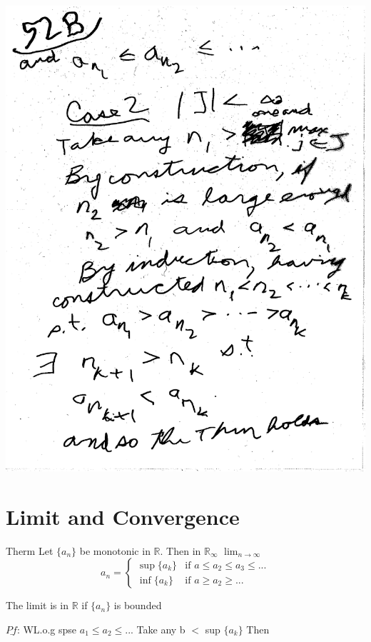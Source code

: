 \documentclass[10pt,a4paper]{article}
\begin{document}
{{\includegraphics[scale=.5]{Pages/SL_11} 

\newpage
\section{Limit and Convergence}


Therm Let $\{ a_n \}$ be monotonic
in $\mathbb{R}$. Then in $\mathbb{R}_{\infty}$
$\lim_{n \rightarrow{\infty}}$
$$a_n = \begin{cases} 
\sup \{ a_k \} & \mbox{if } a \leq a_2 \leq a_3 \leq...\\
\inf \{ a_k \} & \mbox{if } a\geq a_2 \geq...
\end{cases}$$

The limit is in  $\mathbb{R}$ if $\{ a_n \}$ is bounded


$\underline{Pf}$: WL.o.g spse  $a_1 \leq a_2 \leq ...$ Take any b $<$ sup $\{ a_k \}$ Then 

}}
\end{document}
